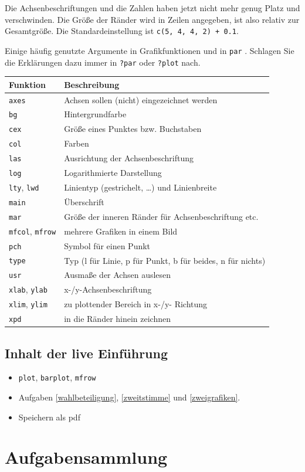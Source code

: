 \documentclass[]{book}
\providecommand{\tightlist}{%
  \setlength{\itemsep}{0pt}\setlength{\parskip}{0pt}}
\begin{document}
Die Achsenbeschriftungen und die Zahlen haben jetzt nicht mehr genug Platz und verschwinden. Die Größe der Ränder wird in Zeilen angegeben, ist also relativ zur Gesamtgröße. Die Standardeinstellung ist \texttt{c(5,\ 4,\ 4,\ 2)\ +\ 0.1}.

Einige häufig genutzte Argumente in Grafikfunktionen und in \texttt{par} \citep[nach][verändert]{Ligges2008}. Schlagen Sie die Erklärungen dazu immer in \texttt{?par} oder \texttt{?plot} nach.

\begin{longtable}[]{@{}ll@{}}
\toprule
Funktion & Beschreibung\tabularnewline
\midrule
\endhead
\texttt{axes} & Achsen sollen (nicht) eingezeichnet werden\tabularnewline
\texttt{bg} & Hintergrundfarbe\tabularnewline
\texttt{cex} & Größe eines Punktes bzw. Buchstaben\tabularnewline
\texttt{col} & Farben\tabularnewline
\texttt{las} & Ausrichtung der Achsenbeschriftung\tabularnewline
\texttt{log} & Logarithmierte Darstellung\tabularnewline
\texttt{lty}, \texttt{lwd} & Linientyp (gestrichelt, \ldots{}) und Linienbreite\tabularnewline
\texttt{main} & Überschrift\tabularnewline
\texttt{mar} & Größe der inneren Ränder für Achsenbeschriftung etc.\tabularnewline
\texttt{mfcol}, \texttt{mfrow} & mehrere Grafiken in einem Bild\tabularnewline
\texttt{pch} & Symbol für einen Punkt\tabularnewline
\texttt{type} & Typ (l für Linie, p für Punkt, b für beides, n für nichts)\tabularnewline
\texttt{usr} & Ausmaße der Achsen auslesen\tabularnewline
\texttt{xlab}, \texttt{ylab} & x-/y-Achsenbeschriftung\tabularnewline
\texttt{xlim}, \texttt{ylim} & zu plottender Bereich in x-/y- Richtung\tabularnewline
\texttt{xpd} & in die Ränder hinein zeichnen\tabularnewline
\bottomrule
\end{longtable}

\hypertarget{inhalt-der-live-einfuxfchrung-2}{%
\section{Inhalt der live Einführung}\label{inhalt-der-live-einfuxfchrung-2}}

\begin{itemize}
\tightlist
\item
  \texttt{plot}, \texttt{barplot}, \texttt{mfrow}
\item
  Aufgaben \ref{wahlbeteiligung}, \ref{zweitstimme} und \ref{zweigrafiken}.
\item
  Speichern als pdf
\end{itemize}

\hypertarget{aufgabensammlung}{%
\chapter{Aufgabensammlung}\label{aufgabensammlung}}
\end{document}
